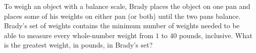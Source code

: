 To weigh an object with a balance scale, Brady places the object on one pan and places some of his weights on either pan (or both) until the two pans balance. Brady's set of weights contains the minimum number of weights needed to be able to measure every whole-number weight from $1$ to $40$ pounds, inclusive. What is the greatest weight, in pounds, in Brady's set?
